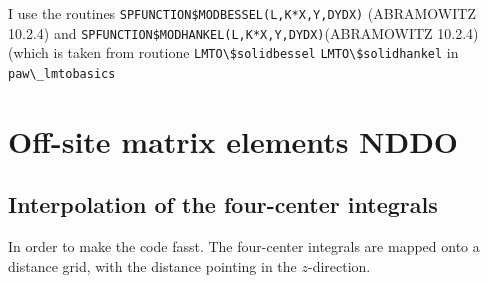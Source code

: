 \documentclass[11pt,a4paper]{report}
\begin{document}






I use the routines \verb|SPFUNCTION$MODBESSEL(L,K*X,Y,DYDX)| (ABRAMOWITZ 10.2.4)
and \verb|SPFUNCTION$MODHANKEL(L,K*X,Y,DYDX)|(ABRAMOWITZ 10.2.4)
(which is taken from routione \verb|LMTO\$solidbessel| 
\verb|LMTO\$solidhankel| in \verb|paw\_lmtobasics|

\chapter{Off-site matrix elements NDDO}

\section{Interpolation of the four-center integrals}
\label{sec:interpolation4center}
In order to make the code fasst. The four-center integrals are mapped
onto a distance grid, with the distance pointing in the $z$-direction.
\end{document}
